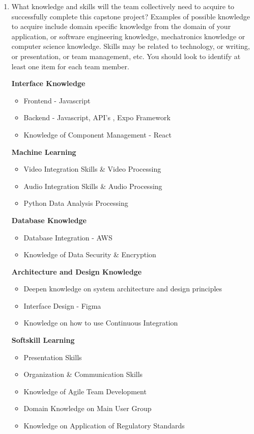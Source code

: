 \documentclass[12pt]{article}
\begin{document}
\begin{enumerate}
  \item What knowledge and skills will the team collectively need to acquire to
  successfully complete this capstone project?  Examples of possible knowledge
  to acquire include domain specific knowledge from the domain of your
  application, or software engineering knowledge, mechatronics knowledge or
  computer science knowledge.  Skills may be related to technology, or writing,
  or presentation, or team management, etc.  You should look to identify at
  least one item for each team member.

  \textbf{Interface Knowledge} 
  \begin{itemize}
    \item Frontend - Javascript
    \item Backend - Javascript, API's , Expo Framework
    \item Knowledge of Component Management - React
  \end{itemize}
  \textbf{Machine Learning} 
  \begin{itemize}
    \item Video Integration Skills \& Video Processing
    \item Audio Integration Skills \& Audio Processing
    \item Python Data Analysis Processing
  \end{itemize}
\textbf{Database Knowledge} 
\begin{itemize}
  \item Database Integration - AWS
  \item Knowledge of Data Security \& Encryption
\end{itemize}

\textbf{Architecture and Design Knowledge} 
\begin{itemize}
  \item Deepen knowledge on system architecture and design principles
  \item Interface Design - Figma
  \item Knowledge on how to use Continuous Integration
\end{itemize}

\textbf{Softskill Learning}
\begin{itemize}
  \item Presentation Skills
  \item Organization \& Communication Skills
  \item Knowledge of Agile Team Development
  \item Domain Knowledge on Main User Group
  \item Knowledge on Application of Regulatory Standards
\end{itemize}


\end{enumerate}
\end{document}
